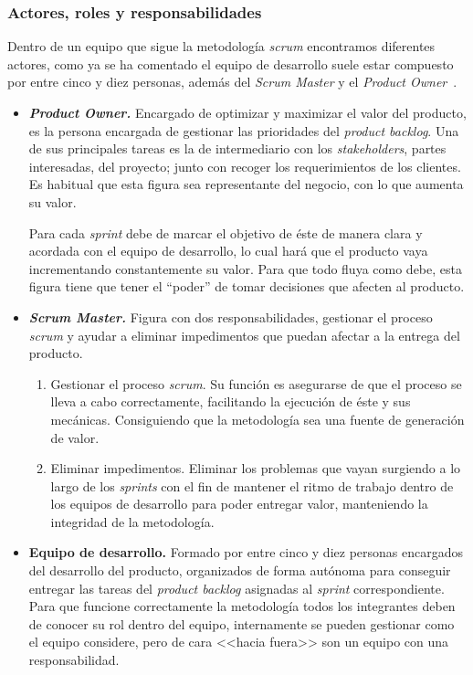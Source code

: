 \subsubsection{Actores, roles y responsabilidades}
Dentro de un equipo que sigue la metodología \textit{scrum} encontramos diferentes actores, como ya se ha comentado el equipo de desarrollo suele estar compuesto por entre cinco y diez personas, además del \textit{Scrum Master} y el \textit{Product Owner}~\cite{julioroche_2020}.
\begin{itemize}
\item \textbf{\textit{Product Owner.}} Encargado de optimizar y maximizar el valor del producto, es la persona encargada de gestionar las prioridades del \textit{product backlog}. Una de sus principales tareas es la de intermediario con los \textit{stakeholders}, partes interesadas, del proyecto; junto con recoger los requerimientos de los clientes. Es habitual que esta figura sea representante del negocio, con lo que aumenta su valor.

Para cada \textit{sprint} debe de marcar el objetivo de éste de manera clara y acordada con el equipo de desarrollo, lo cual hará que el producto vaya incrementando constantemente su valor. Para que todo fluya como debe, esta figura tiene que tener el ``poder'' de tomar decisiones que afecten al producto.

\item \textbf{\textit{Scrum Master.}} Figura con dos responsabilidades, gestionar el proceso \textit{scrum} y ayudar a eliminar impedimentos que puedan afectar a la entrega del producto.
\begin{enumerate}
\item Gestionar el proceso \textit{scrum}. Su función es asegurarse de que el proceso se lleva a cabo correctamente, facilitando la ejecución de éste y sus mecánicas. Consiguiendo que la metodología sea una fuente de generación de valor.
\item Eliminar impedimentos. Eliminar los problemas que vayan surgiendo a lo largo de los \textit{sprints} con el fin de mantener el ritmo de trabajo dentro de los equipos de desarrollo para poder entregar valor, manteniendo la integridad de la metodología.
\end{enumerate}
\item \textbf{Equipo de desarrollo.} Formado por entre cinco y diez personas encargados del desarrollo del producto, organizados de forma autónoma para conseguir entregar las tareas del \textit{product backlog} asignadas al \textit{sprint} correspondiente. Para que funcione correctamente la metodología todos los integrantes deben de conocer su rol dentro del equipo, internamente se pueden gestionar como el equipo considere, pero de cara <<hacia fuera>> son un equipo con una responsabilidad.
\end{itemize}

